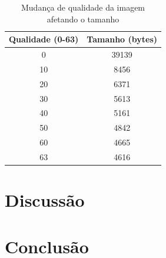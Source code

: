 \documentclass[12pt]{beamer}
\begin{document}
\begin{frame}[allowframebreaks]
\begin{table}[!h]
        \centering
        \begin{tabular}{@{}c|c@{}}
            \toprule
            Qualidade (0-63) & Tamanho (bytes) \\ \midrule
            0                & 39139           \\
            10               & 8456            \\
            20               & 6371            \\
            30               & 5613            \\
            40               & 5161            \\
            50               & 4842            \\
            60               & 4665            \\
            63               & 4616            \\ \bottomrule
        \end{tabular}
        \caption{Mudança de qualidade da imagem afetando o tamanho}
        \label{tab:quality}
    \end{table}
\end{frame}

\section{Discussão}

\section{Conclusão}
\end{document}
